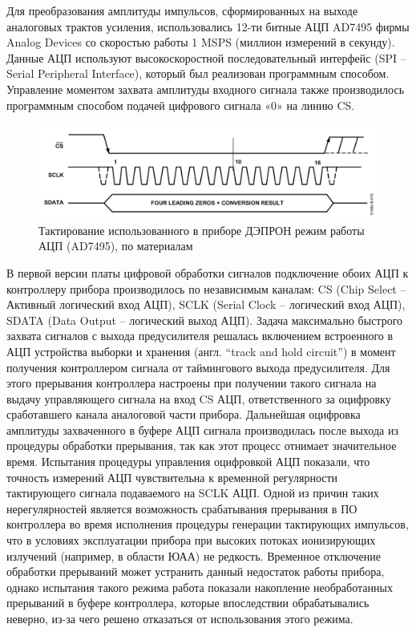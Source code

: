 Для преобразования амплитуды импульсов, сформированных на выходе аналоговых трактов усиления, использовались 12-ти битные АЦП AD7495 фирмы Analog Devices со скоростью работы 1 MSPS (миллион измерений в секунду). Данные АЦП используют высокоскоростной последовательный интерфейс (SPI -- Serial Peripheral Interface), который был реализован программным способом. Управление моментом захвата амплитуды входного сигнала также производилось программным способом подачей цифрового сигнала «0» на линию CS. 
\begin{figure}
	\centering
	\includegraphics[width=0.7\linewidth]{images/adc}
	\caption{Тактирование использованного в приборе ДЭПРОН режим работы АЦП (AD7495), по материалам \cite{AnalogDevices2005} }
	\label{fig:adc}
\end{figure}

В первой версии платы цифровой обработки сигналов подключение обоих АЦП к контроллеру прибора производилось по независимым каналам: CS (Chip Select -- Активный логический вход АЦП), SCLK (Serial Clock -- логический вход АЦП), SDATA (Data Output -- логический выход АЦП). Задача максимально быстрого захвата сигналов с выхода предусилителя решалась включением встроенного в АЦП устройства выборки и хранения (англ. ``track and hold circuit'') в момент получения контроллером сигнала от таймингового выхода предусилителя. Для этого прерывания контроллера настроены при получении такого сигнала на выдачу управляющего сигнала на вход CS АЦП, ответственного за оцифровку сработавшего канала аналоговой части прибора. Дальнейшая оцифровка амплитуды захваченного в буфере АЦП сигнала производилась после выхода из процедуры обработки прерывания, так как этот процесс отнимает значительное время. Испытания процедуры управления оцифровкой АЦП показали, что точность измерений АЦП чувствительна к временной регулярности тактирующего сигнала подаваемого на SCLK АЦП. Одной из причин таких нерегулярностей является возможность срабатывания прерывания в ПО контроллера во время исполнения процедуры генерации тактирующих импульсов, что в условиях эксплуатации прибора при высоких потоках ионизирующих излучений (например, в области ЮАА) не редкость. Временное отключение обработки прерываний может устранить данный недостаток работы прибора, однако испытания такого режима работа показали накопление необработанных прерываний в буфере контроллера, которые впоследствии обрабатывались неверно, из-за чего решено отказаться от использования этого режима.

